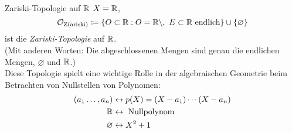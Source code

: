 \begin{example}{Zariski-Topologie auf $ \mathbb{R} $}
  $ X = \mathbb{R} $,
  \begin{equation*}
    \mathcal{O}_\text{Z(ariski)} \coloneqq \{ O \subset \mathbb{R} : O = \mathbb{R} \setminus, \ E \subset \mathbb{R} \text{ endlich} \} \cup \{ \varnothing \}
  \end{equation*}
  ist die \emph{Zariski-Topologie} auf $ \mathbb{R} $. \\
  (Mit anderen Worten: Die abgeschlossenen Mengen sind genau die endlichen Mengen, $ \varnothing $ und $ \mathbb{R} $.) \\
  Diese Topologie spielt eine wichtige Rolle in der algebraischen Geometrie beim Betrachten von Nullstellen von Polynomen: \\
  \begin{align*}
    (a_1 \dots, a_n) &\leftrightarrow p(X) = (X-a_1)\cdots(X-a_n) \\
     \mathbb{R} &\leftrightarrow \text{ Nullpolynom} \\
     \varnothing &\leftrightarrow X^2+1
  \end{align*}
\end{example}